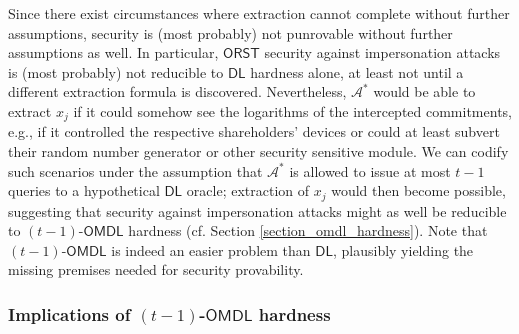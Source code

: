 \documentclass{iacrtrans}
\begin{document}
Since there exist circumstances where
extraction cannot complete without further assumptions,
security is (most probably)
not punrovable without further assumptions as well.
In particular,
$\mathsf{ORST}$ security
against impersonation attacks is (most probably)
not reducible to $\mathsf{DL}$ hardness alone,
at least not until a different extraction formula is discovered.
Nevertheless, $\mathcal{A}^*$ would be able to extract $x_j$
if it could somehow see the logarithms
of the intercepted commitments, e.g.,
if it controlled the respective shareholders' devices
or could at least subvert their random number generator
or other security sensitive module.
We can codify such scenarios under the assumption
that $\mathcal{A}^*$ is allowed to issue at most
$t-1$ queries to a hypothetical $\mathsf{DL}$ oracle;
extraction of $x_j$
would then become possible,
suggesting that security against impersonation attacks
might as well be reducible to
$(t-1)$-$\mathsf{OMDL}$ hardness
(cf. Section \ref{section_omdl_hardness}).
Note that $(t-1)$-$\mathsf{OMDL}$ is indeed
an easier problem than $\mathsf{DL}$,
plausibly yielding the missing premises needed
for security provability.


\subsubsection{Implications of $(t-1)$-$\mathsf{OMDL}$ hardness}\label{section_omdl_implications}
\end{document}
